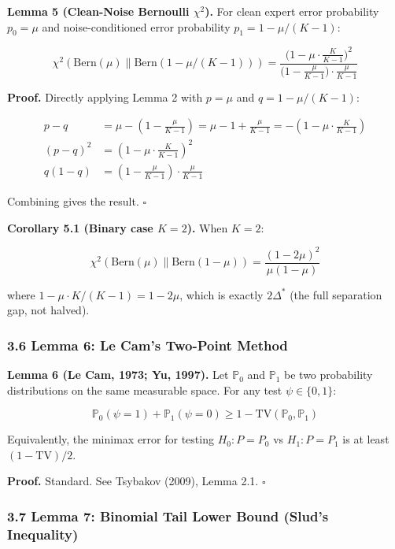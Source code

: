 \documentclass[
  12pt,
]{article}
\begin{document}
\textbf{Lemma 5 (Clean-Noise Bernoulli \(\chi^2\)).} For clean expert
error probability \(p_0 = \mu\) and noise-conditioned error probability
\(p_1 = 1 - \mu/(K-1)\):

\[\chi^2(\text{Bern}(\mu) \parallel \text{Bern}(1-\mu/(K-1))) = \frac{\bigl(1 - \mu \cdot \frac{K}{K-1}\bigr)^2}{\bigl(1 - \frac{\mu}{K-1}\bigr) \cdot \frac{\mu}{K-1}}\]

\textbf{Proof.} Directly applying Lemma 2 with \(p = \mu\) and
\(q = 1 - \mu/(K-1)\):

\[\begin{aligned}
p - q &= \mu - \left(1 - \frac{\mu}{K-1}\right) = \mu - 1 + \frac{\mu}{K-1} = -\left(1 - \mu \cdot \frac{K}{K-1}\right) \\
(p-q)^2 &= \left(1 - \mu \cdot \frac{K}{K-1}\right)^2 \\
q(1-q) &= \left(1 - \frac{\mu}{K-1}\right) \cdot \frac{\mu}{K-1}
\end{aligned}\]

Combining gives the result. \(\square\)

\textbf{Corollary 5.1 (Binary case \(K=2\)).} When \(K=2\):

\[\chi^2(\text{Bern}(\mu) \parallel \text{Bern}(1-\mu)) = \frac{(1 - 2\mu)^2}{\mu(1-\mu)}\]

where \(1 - \mu \cdot K/(K-1) = 1 - 2\mu\), which is exactly
\(2\Delta^*\) (the full separation gap, not halved).

\subsubsection{3.6 Lemma 6: Le Cam's Two-Point
Method}\label{lemma-6-le-cams-two-point-method}

\textbf{Lemma 6 (Le Cam, 1973; Yu, 1997).} Let \(\mathbb{P}_0\) and
\(\mathbb{P}_1\) be two probability distributions on the same measurable
space. For any test \(\psi \in \{0,1\}\):

\[\mathbb{P}_0(\psi = 1) + \mathbb{P}_1(\psi = 0) \geq 1 - \text{TV}(\mathbb{P}_0, \mathbb{P}_1)\]

Equivalently, the minimax error for testing \(H_0: P = P_0\) vs
\(H_1: P = P_1\) is at least \((1 - \text{TV})/2\).

\textbf{Proof.} Standard. See Tsybakov (2009), Lemma 2.1. \(\square\)

\subsubsection{3.7 Lemma 7: Binomial Tail Lower Bound (Slud's
Inequality)}\label{lemma-7-binomial-tail-lower-bound-sluds-inequality}
\end{document}
